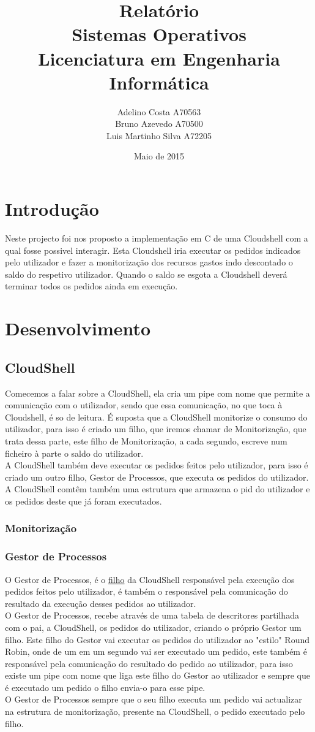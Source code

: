 \documentclass[a4paper]{report}
\title{Relatório\\ Sistemas Operativos\\
		Licenciatura em Engenharia Informática}
\author{Adelino Costa A70563 \\ Bruno Azevedo A70500 \\ Luis Martinho Silva A72205}
\date{Maio de 2015}
\begin{document}
\maketitle
\tableofcontents
\chapter{Introdução}
\label{sec:intro}
Neste projecto foi nos proposto a implementação em C de uma Cloudshell com a qual fosse possivel interagir. Esta Cloudshell iria executar os pedidos indicados pelo utilizador e fazer a monitorização dos recursos gastos indo descontado o saldo do respetivo utilizador. Quando o saldo se esgota a Cloudshell deverá terminar todos os pedidos ainda em execução.
\chapter{Desenvolvimento}
\label{sec:desen}
\section{CloudShell}
Comecemos a falar sobre a CloudShell, ela cria um pipe com nome que permite a comunicação com o utilizador, sendo que essa comunicação, no que toca à Cloudshell, é so de leitura. É suposta que a CloudShell monitorize o consumo do utilizador, para isso é criado um filho, que iremos chamar de Monitorização, que trata dessa parte, este filho de Monitorização, a cada segundo, escreve num ficheiro à parte o saldo do utilizador.\\
A CloudShell também deve executar os pedidos feitos pelo utilizador, para isso é criado um outro filho, Gestor de Processos, que executa os pedidos do utilizador. A CloudShell comtêm também uma estrutura que armazena o pid do utilizador e os pedidos deste que já foram executados. 
\subsection{Monitorização}
\subsection{Gestor de Processos}
O Gestor de Processos, é o \underline{filho} da CloudShell responsável pela execução dos pedidos feitos pelo utilizador, é também o responsável pela comunicação do resultado da execução desses pedidos ao utilizador.\\
O Gestor de Processos, recebe através de uma tabela de descritores partilhada com o pai, a CloudShell, os pedidos do utilizador, criando o próprio Gestor um filho. Este filho do Gestor vai executar os pedidos do utilizador ao "estilo" Round Robin, onde de um em um segundo vai ser executado um pedido, este também é responsável pela comunicação do resultado do pedido ao utilizador, para isso existe um pipe com nome que liga este filho do Gestor ao utilizador e sempre que é executado um pedido o filho envia-o para esse pipe.\\
O Gestor de Processos sempre que o seu filho executa um pedido vai actualizar na estrutura de monitorização, presente na CloudShell, o pedido  executado pelo filho.
\end{document}
